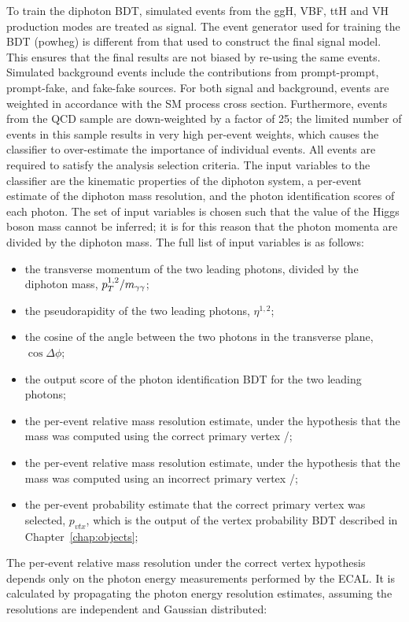 To train the diphoton BDT, simulated events from the ggH, VBF, ttH 
and VH production modes are treated as signal. 
The event generator used for training the BDT (powheg) is different from that used to construct
the final signal model.
This ensures that the final results are not biased by re-using the same events.
Simulated background events include the contributions from prompt-prompt, prompt-fake, 
and fake-fake sources.
For both signal and background, 
events are weighted in accordance with the SM process cross section.
Furthermore, events from the QCD sample are down-weighted by a factor of 25;
the limited number of events in this sample results in very high per-event weights, 
which causes the classifier to over-estimate the importance of individual events.
All events are required to satisfy the analysis selection criteria.
The input variables to the classifier are the kinematic properties of the diphoton system, 
a per-event estimate of the diphoton mass resolution, 
and the photon identification scores of each photon.
The set of input variables is chosen such that the value of the Higgs boson mass cannot be inferred;
it is for this reason that the photon momenta are divided by the diphoton mass.
The full list of input variables is as follows:
\begin{itemize}
\item the transverse momentum of the two leading photons, divided by the diphoton mass, $p_T^{1,2}/m_{\gamma\gamma}$;
\item the pseudorapidity of the two leading photons, $\eta^{1,2}$;
\item the cosine of the angle between the two photons in the transverse plane, $\cos{\Delta\phi}$;
\item the output score of the photon identification BDT for the two leading photons;
\item the per-event relative mass resolution estimate, 
      under the hypothesis that the mass was computed using the correct primary vertex \srv/\mgg;
\item the per-event relative mass resolution estimate, 
      under the hypothesis that the mass was computed using an incorrect primary vertex \swv/\mgg;
\item the per-event probability estimate that the correct primary vertex was selected, $p_{vtx}$,
      which is the output of the vertex probability BDT described in Chapter~\ref{chap:objects};
\end{itemize}

The per-event relative mass resolution under the correct vertex hypothesis 
depends only on the photon energy measurements performed by the ECAL.
It is calculated by propagating the photon energy resolution estimates, 
assuming the resolutions are independent and Gaussian distributed:

